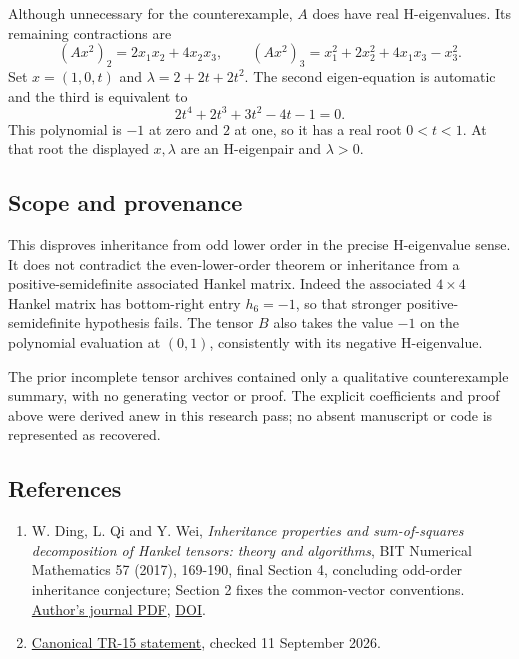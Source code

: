 \documentclass[
  11pt,
]{article}
\providecommand{\tightlist}{%
  \setlength{\itemsep}{0pt}\setlength{\parskip}{0pt}}
\begin{document}
Although unnecessary for the counterexample, \(A\) does have real
H-eigenvalues. Its remaining contractions are \[
(Ax^2)_2=2x_1x_2+4x_2x_3,\qquad
(Ax^2)_3=x_1^2+2x_2^2+4x_1x_3-x_3^2.
\] Set \(x=(1,0,t)\) and \(\lambda=2+2t+2t^2\). The second
eigen-equation is automatic and the third is equivalent to \[
2t^4+2t^3+3t^2-4t-1=0.
\] This polynomial is \(-1\) at zero and \(2\) at one, so it has a real
root \(0<t<1\). At that root the displayed \(x,\lambda\) are an
H-eigenpair and \(\lambda>0\).

\subsection{Scope and provenance}\label{scope-and-provenance}

This disproves inheritance from odd lower order in the precise
H-eigenvalue sense. It does not contradict the even-lower-order theorem
or inheritance from a positive-semidefinite associated Hankel matrix.
Indeed the associated \(4\times4\) Hankel matrix has bottom-right entry
\(h_6=-1\), so that stronger positive-semidefinite hypothesis fails. The
tensor \(B\) also takes the value \(-1\) on the polynomial evaluation at
\((0,1)\), consistently with its negative H-eigenvalue.

The prior incomplete tensor archives contained only a qualitative
counterexample summary, with no generating vector or proof. The explicit
coefficients and proof above were derived anew in this research pass; no
absent manuscript or code is represented as recovered.

\subsection{References}\label{references}

\begin{enumerate}
\def\labelenumi{\arabic{enumi}.}
\tightlist
\item
  W. Ding, L. Qi and Y. Wei, \emph{Inheritance properties and
  sum-of-squares decomposition of Hankel tensors: theory and
  algorithms}, BIT Numerical Mathematics 57 (2017), 169-190, final
  Section 4, concluding odd-order inheritance conjecture; Section 2
  fixes the common-vector conventions.
  \href{https://www.polyu.edu.hk/ama/staff/new/qilq/BIT-DQW.pdf}{Author's
  journal PDF}, \href{https://doi.org/10.1007/s10543-016-0622-0}{DOI}.
\item
  \href{https://github.com/ajt60gaibb/OpenProblemsInNLA/blob/main/tensor-computations/TR-15/README.md}{Canonical
  TR-15 statement}, checked 11 September 2026.
\end{enumerate}
\end{document}
